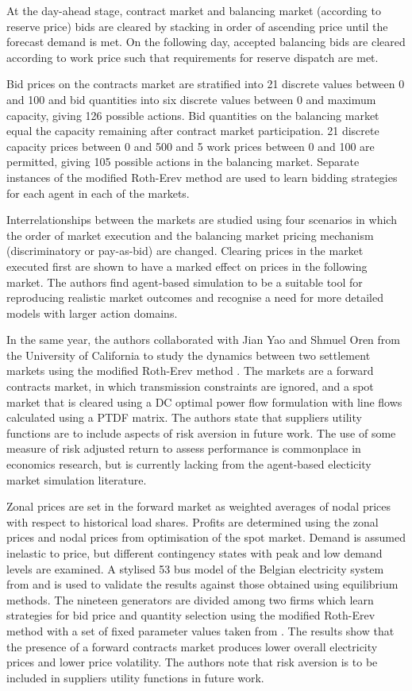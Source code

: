 At the day-ahead stage, contract market and balancing market (according to
reserve price) bids are cleared by stacking in order of ascending price until the
forecast demand is met.  On the following day, accepted balancing bids are
cleared according to work price such that requirements for reserve dispatch
are met.

Bid prices on the contracts market are stratified into 21 discrete
values between 0 and 100 and bid quantities into six discrete values between 0
and maximum capacity, giving 126 possible actions.  Bid quantities on the
balancing market equal the capacity remaining after contract market
participation.  21 discrete capacity prices between 0 and 500 and 5 work prices
between 0 and 100 are permitted, giving 105 possible actions in the balancing
market.  Separate instances of the modified Roth-Erev method are used to learn
bidding strategies for each agent in each of the markets.

Interrelationships between the markets are studied using four scenarios in
which the order of market execution and the balancing market pricing mechanism
(discriminatory or pay-as-bid) are changed.  Clearing prices in the market
executed first are shown to have a marked effect on prices in the
following market.  The authors find agent-based simulation to be a suitable
tool for reproducing realistic market outcomes and recognise a need for more
detailed models with larger action domains.

In the same year, the authors collaborated with Jian Yao and Shmuel Oren from
the University of California to study the dynamics between two settlement
markets using the modified Roth-Erev method \cite{viet:06}.  The markets are a
forward contracts market, in which transmission constraints are ignored, and a spot
market that is cleared using a DC optimal power flow formulation with line
flows calculated using a PTDF matrix.  The authors state that suppliers utility
functions are to include aspects of risk aversion in future work.  The use of
some measure of risk adjusted return to assess performance is commonplace in
economics research, but is currently lacking from the agent-based electicity
market simulation literature.

Zonal prices are set in the forward market as weighted averages of nodal prices
with respect to historical load shares.  Profits are determined using the
zonal prices and nodal prices from optimisation of the spot market.  Demand is assumed
inelastic to price, but different contingency states with peak and low demand
levels are examined.  A stylised 53 bus model of the Belgian electricity
system from  and  is used to validate the results
against those obtained using equilibrium methods.  The nineteen generators are divided among
two firms which learn strategies for bid price and quantity selection using the
modified Roth-Erev method with a set of fixed parameter values taken from
.  The results show that the presence of a forward contracts
market produces lower overall electricity prices and lower price volatility.
The authors note that risk aversion is to be included in suppliers utility
functions in future work.

